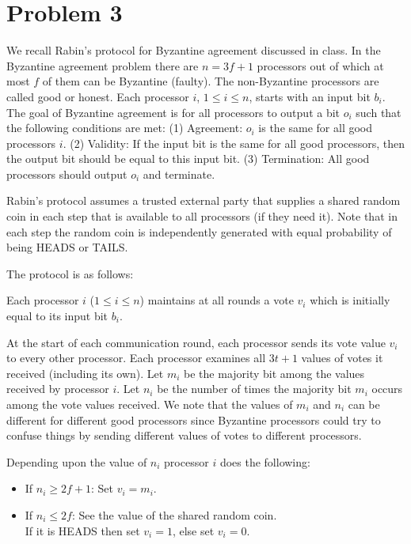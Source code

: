 \documentclass[11pt]{article}
\begin{document}
\section*{Problem 3}

We recall Rabin's protocol for Byzantine agreement discussed in class. In the Byzantine agreement problem there are $n = 3f+1$ processors out of which at most $f$ of them can be Byzantine (faulty). The non-Byzantine processors are called good or honest.  Each processor $i$, $1 \leq i \leq n$, starts with an input bit $b_i$. The goal of Byzantine agreement is for all processors to output a bit $o_i$
such that the following conditions are met: (1) Agreement: $o_i$ is the same for all good processors $i$.
(2) Validity: If the input bit is the same for all good processors, then the output bit should be equal to this input bit.
(3) Termination: All good processors should output $o_i$ and terminate.


Rabin's protocol assumes a trusted external party that supplies a shared random coin in each step that is available to all processors (if they need it). Note that in each step the random coin is independently generated with equal probability of being HEADS or TAILS.

The protocol is as follows:


Each processor $i$ ($1\leq i \leq n$) maintains at all rounds a vote $v_i$ which is initially equal to its input bit $b_i$. 

At the start of each communication round, each processor sends its vote value $v_i$
to every other processor. Each processor examines all $3t + 1$ values of votes
it received (including its own). 
Let $m_i$ be the majority bit among
the values received by processor $i$. Let $n_i$ be the number of times the majority bit $m_i$ occurs among
the vote values received. We note that the values of $m_i$ and $n_i$ can be different for different good processors since  Byzantine processors could try to confuse things
by sending different values of votes to different processors.

Depending upon the value of $n_i$ 
processor $i$ does the following:
\begin{itemize}
\item If $n_i \geq 2f+1$: Set  $v_i = m_i$.
\item If $n_i \leq 2f$: See the value of the shared random coin. \\ If it is HEADS then
set $v_i = 1$, else set $v_i  = 0$.
\end{itemize}
\end{document}
